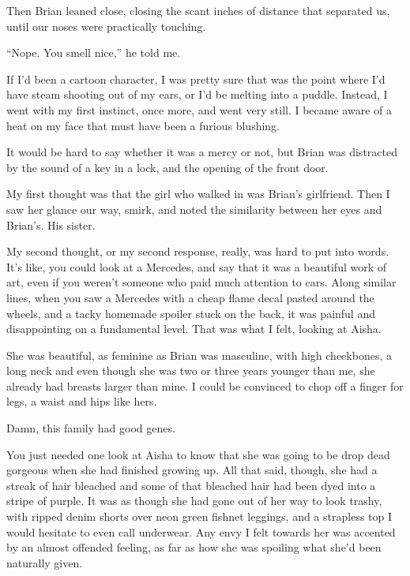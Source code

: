 Then Brian leaned close, closing the scant inches of distance that separated us, until our noses were practically touching.



``Nope.  You smell nice,'' he told me.



If I'd been a cartoon character, I was pretty sure that was the point where I'd have steam shooting out of my ears, or I'd be melting into a puddle.  Instead, I went with my first instinct, once more, and went very still.  I became aware of a heat on my face that must have been a furious blushing.



It would be hard to say whether it was a mercy or not, but Brian was distracted by the sound of a key in a lock, and the opening of the front door.



My first thought was that the girl who walked in was Brian's girlfriend.  Then I saw her glance our way, smirk, and noted the similarity between her eyes and Brian's.  His sister.



My second thought, or my second response, really, was hard to put into words.  It's like, you could look at a Mercedes, and say that it was a beautiful work of art, even if you weren't someone who paid much attention to cars.  Along similar lines, when you saw a Mercedes with a cheap flame decal pasted around the wheels, and a tacky homemade spoiler stuck on the back, it was painful and disappointing on a fundamental level.  That was what I felt, looking at Aisha.



She was beautiful, as feminine as Brian was masculine, with high cheekbones, a long neck and even though she was two or three years younger than me, she already had breasts larger than mine.  I could be convinced to chop off a finger for legs, a waist and hips like hers.



Damn, this family had good genes.



You just needed one look at Aisha to know that she was going to be drop dead gorgeous when she had finished growing up.  All that said, though, she had a streak of hair bleached and some of that bleached hair had been dyed into a stripe of purple.  It was as though she had gone out of her way to look trashy, with ripped denim shorts over neon green fishnet leggings, and a strapless top I would hesitate to even call underwear.  Any envy I felt towards her was accented by an almost offended feeling, as far as how she was spoiling what she'd been naturally given.



